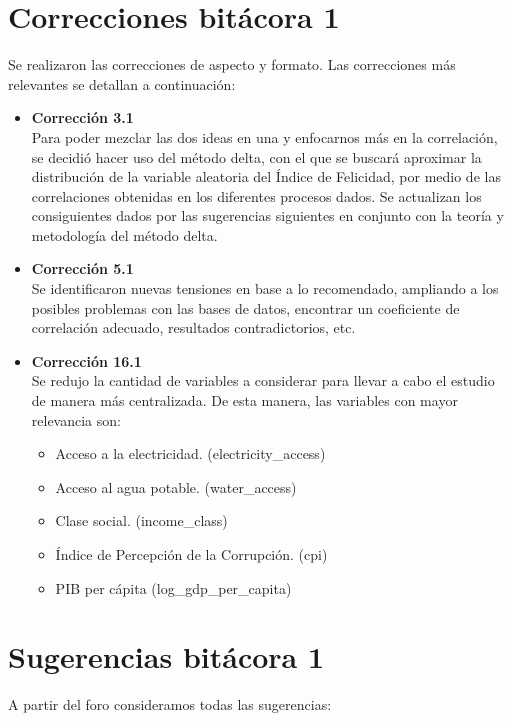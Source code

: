 \section{Correcciones bitácora 1}
Se realizaron las correcciones de aspecto y formato. Las correcciones más relevantes se detallan a continuación:

\begin{itemize}
    \item \textbf{Corrección 3.1} \\
    Para poder mezclar las dos ideas en una y enfocarnos más en la correlación, se decidió hacer uso del método delta, con el que se buscará aproximar la distribución de la variable aleatoria del Índice de Felicidad, por medio de las correlaciones obtenidas en los diferentes procesos dados. Se actualizan los consiguientes dados por las sugerencias siguientes en conjunto con la teoría y metodología del método delta. 
    
    \item \textbf{Corrección 5.1}\\
    Se identificaron nuevas tensiones en base a lo recomendado, ampliando a los posibles problemas con las bases de datos, encontrar un coeficiente de correlación adecuado, resultados contradictorios, etc.
    
    \item \textbf{Corrección 16.1} \\
    Se redujo la cantidad de variables a considerar para llevar a cabo el estudio de manera más centralizada. De esta manera, las variables con mayor relevancia son:

    \begin{itemize}
        \item Acceso a la electricidad. (electricity\_access)

        \item Acceso al agua potable. (water\_access)

        \item Clase social. (income\_class)

        \item Índice de Percepción de la Corrupción. (cpi)
        
        \item PIB per cápita (log\_gdp\_per\_capita)
    \end{itemize}
    
\end{itemize}

\section{Sugerencias bitácora 1}
A partir del foro consideramos todas las sugerencias:

